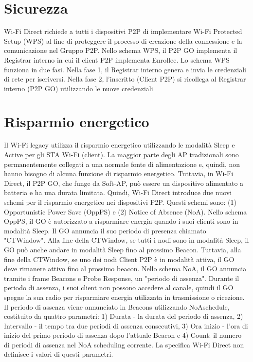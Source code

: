 \section{Sicurezza}

Wi-Fi Direct richiede a tutti i dispositivi P2P di 
implementare Wi-Fi Protected Setup (WPS) \cite{WPS} al fine di
proteggere il processo di creazione della connessione e
la comunicazione nel Gruppo P2P. Nello schema WPS, il 
P2P GO implementa il Registrar interno in cui il client 
P2P implementa Enrollee. Lo schema WPS funziona in due fasi.
Nella fase 1, il Registrar interno genera e invia le credenziali 
di rete per iscriversi. Nella fase 2, l'inscritto (Client P2P) 
si ricollega al Registrar interno (P2P GO) utilizzando le 
nuove credenziali



\section{Risparmio energetico}

Il Wi-Fi legacy utilizza il risparmio energetico utilizzando le modalità
Sleep e Active per gli STA Wi-Fi (client). La maggior parte degli AP 
tradizionali sono permanentemente collegati a una normale fonte di 
alimentazione e, quindi, non hanno bisogno di alcuna funzione di risparmio 
energetico. Tuttavia, in Wi-Fi Direct, il P2P GO, che funge da Soft-AP,
può essere un dispositivo alimentato a batteria e ha una durata limitata.
Quindi,
Wi-Fi Direct introduce due nuovi schemi per il risparmio energetico nei 
dispositivi P2P. Questi schemi sono: (1) Opportunistic Power Save
(OppPS) e (2) Notice of Absence (NoA). Nello schema OppPS, il GO è 
autorizzato a risparmiare energia quando i suoi clienti sono in 
modalità Sleep. Il GO annuncia il suo periodo di presenza chiamato 
"CTWindow". Alla fine della CTWindow, se tutti i nodi sono in modalità 
Sleep, il GO può anche andare in modalità Sleep fino al prossimo Beacon.
Tuttavia, alla fine della CTWindow, se uno dei nodi Client P2P è in 
modalità attiva, il GO deve rimanere attivo fino al prossimo beacon.
Nello schema NoA, il GO annuncia tramite i frame Beacons e Probe
Response, un "periodo di assenza". Durante il periodo di assenza,
i suoi client non possono accedere al canale, quindi il GO spegne 
la sua radio per risparmiare energia utilizzata in trasmissione o 
ricezione. Il periodo di assenza viene annunciato in Beacons 
utilizzando NoAschedule, costituito da quattro parametri: 1) 
Durata - la durata del periodo di assenza, 2) Intervallo - il 
tempo tra due periodi di assenza consecutivi, 3) Ora inizio - 
l'ora di inizio del primo periodo di assenza dopo l'attuale Beacon 
e 4)  Count: il numero di periodi di assenza nel 
NoA scheduling corrente. La specifica Wi-Fi Direct non 
definisce i valori di questi parametri.
